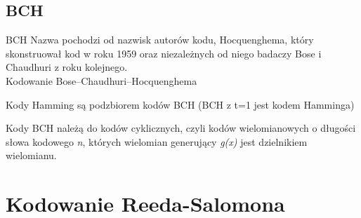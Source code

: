 \documentclass[12pt]{beamer}
\begin{document}
\subsection{BCH}
\begin{frame}{BCH}
Nazwa pochodzi od nazwisk autorów kodu, Hocquenghema, który skonstruował kod w roku 1959 oraz niezależnych od niego badaczy Bose i Chaudhuri z roku kolejnego.\\
Kodowanie Bose–Chaudhuri–Hocquenghema

Kody Hamming są podzbiorem kodów BCH
(BCH z t=1 jest kodem Hamminga)

Kody BCH należą do kodów cyklicznych, czyli kodów wielomianowych o długości słowa kodowego \emph{n}, których wielomian generujący \emph{g(x)} jest dzielnikiem wielomianu.

\end{frame}


\section{Kodowanie Reeda-Salomona}
\end{document}
